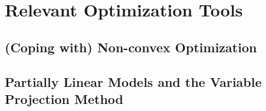 \section{Relevant Optimization Tools}
\label{s,bkgrd,opt}

\subsection{(Coping with) Non-convex Optimization}
\label{ss,bkgrd,opt,ncvx}

\subsection{Partially Linear Models and the Variable Projection Method}
\label{ss,bkgrd,opt,vpm}